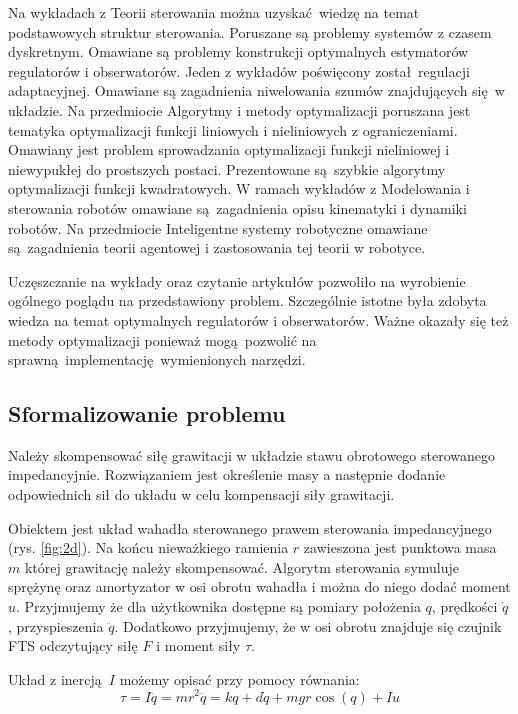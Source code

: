 \documentclass[12pt,a4paper]{article}
\begin{document}
	Na wykładach z Teorii sterowania można uzyskać wiedzę na temat podstawowych struktur sterowania. Poruszane są problemy systemów z czasem dyskretnym. Omawiane są problemy konstrukcji optymalnych estymatorów regulatorów i obserwatorów. Jeden z wykładów poświęcony został regulacji adaptacyjnej. Omawiane są zagadnienia niwelowania szumów znajdujących się w układzie. 	Na przedmiocie Algorytmy i metody optymalizacji poruszana jest tematyka optymalizacji funkcji liniowych i nieliniowych z ograniczeniami. Omawiany jest problem sprowadzania optymalizacji funkcji nieliniowej i niewypukłej do prostszych postaci. Prezentowane są szybkie algorytmy optymalizacji funkcji kwadratowych. W ramach wykładów z  Modelowania i sterowania robotów omawiane są zagadnienia opisu kinematyki i dynamiki robotów. Na przedmiocie Inteligentne systemy robotyczne omawiane są zagadnienia teorii agentowej i zastosowania tej teorii w robotyce.
	
	Uczęszczanie na wykłady oraz czytanie artykułów pozwoliło na wyrobienie ogólnego poglądu na przedstawiony problem. Szczególnie istotne była zdobyta wiedza na temat optymalnych regulatorów i obserwatorów. Ważne okazały się też metody optymalizacji ponieważ mogą pozwolić na sprawną implementację wymienionych narzędzi.
	
	
	\subsection{Sformalizowanie problemu}
	Należy skompensować siłę grawitacji w układzie stawu obrotowego sterowanego impedancyjnie. Rozwiązaniem jest określenie masy a następnie dodanie odpowiednich sił do układu w celu kompensacji siły grawitacji.
	
	Obiektem jest układ wahadła sterowanego prawem sterowania impedancyjnego (rys. \ref{fig:2d}). Na końcu nieważkiego ramienia $r$ zawieszona jest punktowa masa $m$ której grawitację należy skompensować. Algorytm sterowania symuluje sprężynę oraz amortyzator w osi obrotu wahadła i można do niego dodać moment $u$.  Przyjmujemy że dla użytkownika dostępne są pomiary położenia $q$, prędkości $\dot{q}$, przyspieszenia $\ddot{q}$. Dodatkowo przyjmujemy, że w osi obrotu znajduje się czujnik FTS odczytujący siłę $F$ i moment siły $\tau$.
	
	Układ z inercją $I$ możemy opisać przy pomocy równania:
	\begin{equation}
	\label{eq:intro}
	\tau = I\ddot{q} = mr^2\ddot{q} = kq + d\dot{q} + mgr\cos{(q)} + Iu
	\end{equation}
	
\end{document}
